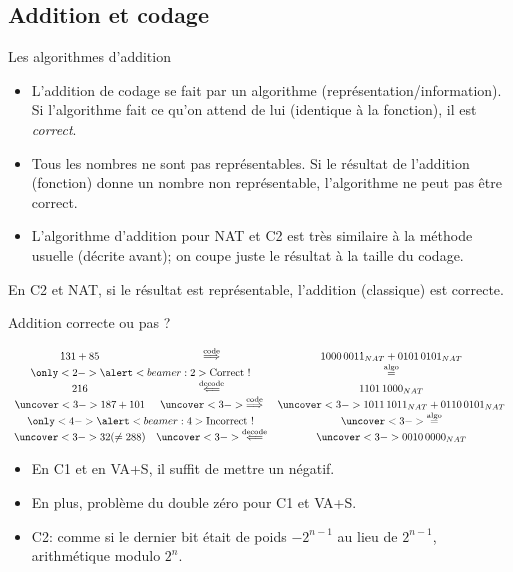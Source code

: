 \subsection{Addition et codage}
\begin{frame}{Les algorithmes d'addition}
  \begin{itemize}
  \item L'addition de codage se fait par un algorithme
    (représentation/information). Si l'algorithme fait ce qu'on attend
    de lui (identique à la fonction), il est \emph{correct}.
  \item Tous les nombres ne sont pas représentables. Si le résultat de
    l'addition (fonction) donne un nombre non représentable,
    l'algorithme ne peut pas être correct.
  \item L'algorithme d'addition pour NAT et C2 est très similaire à la
    méthode usuelle (décrite avant); on coupe juste le résultat à la
    taille du codage.
  \end{itemize}
  \begin{theorem}
    En C2 et NAT, si le résultat est représentable, l'addition
    (classique) est correcte.
  \end{theorem}
\end{frame}
\begin{frame}{Addition correcte ou pas ?}
  \begin{example}
    \[\begin{array}{ccc}
      131+85 & \stackrel{\text{code}}{\Longrightarrow} & 1000\,0011_{NAT}+0101\,0101_{NAT}\\
      \multicolumn{2}{c}{\only<2->{\alert<beamer:2>{\text{Correct !}}}} & \stackrel{\text{algo}}{=}\\
      216 & \stackrel{\text{decode}}{\Longleftarrow} & 1101\,1000_{NAT}\\
      \uncover<3->{187+101} & \uncover<3->{\stackrel{\text{code}}{\Longrightarrow}} & \uncover<3->{1011\,1011_{NAT}+0110\,0101_{NAT}}\\
      \multicolumn{2}{c}{\only<4->{\alert<beamer:4>{\text{Incorrect !}}}} & \uncover<3->{\stackrel{\text{algo}}{=}}\\
      \uncover<3->{32(\neq288)} & \uncover<3->{\stackrel{\text{decode}}{\Longleftarrow}} & \uncover<3->{0010\,0000_{NAT}}\\
    \end{array}\]
  \end{example}
  \begin{itemize}
  \item En C1 et en VA+S, il suffit de mettre un négatif.
  \item En plus, problème du double zéro pour C1 et VA+S.
  \item C2: comme si le dernier bit était de poids $-2^{n-1}$ au lieu de
    $2^{n-1}$, arithmétique modulo $2^n$.
  \end{itemize}
\end{frame}
